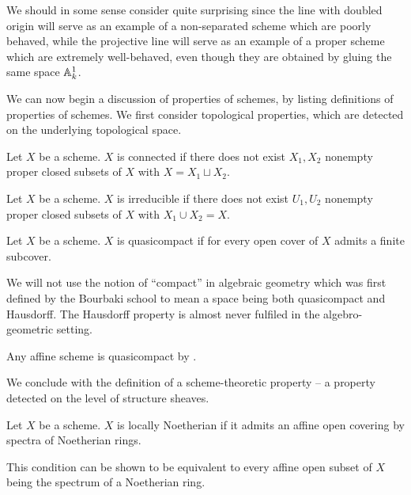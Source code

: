 \begin{remark}
    We should in some sense consider  quite surprising since the line with doubled origin will serve as an example of a non-separated scheme which are poorly behaved, while the projective line will serve as an example of a proper scheme which are extremely well-behaved, even though they are obtained by gluing the same space $\mathbb{A}^{1}_{k}$. 
\end{remark}
We can now begin a discussion of properties of schemes, by listing definitions of properties of schemes. We first consider topological properties, which are detected on the underlying topological space. 
\begin{definition}[Connected]\label{def: connected scheme}
    Let $X$ be a scheme. $X$ is connected if there does not exist $X_{1},X_{2}$ nonempty proper closed subsets of $X$ with $X=X_{1}\sqcup X_{2}$. 
\end{definition}
\begin{definition}[Irreducible]\label{def: irreducible}
    Let $X$ be a scheme. $X$ is irreducible if there does not exist $U_{1},U_{2}$ nonempty proper closed subsets of $X$ with $X_{1}\cup X_{2}=X$. 
\end{definition}
\begin{definition}[Quasicompact]\label{def: quasicompact}
    Let $X$ be a scheme. $X$ is quasicompact if for every open cover of $X$ admits a finite subcover. 
\end{definition}
\begin{remark}
    We will not use the notion of ``compact'' in algebraic geometry which was first defined by the Bourbaki school to mean a space being both quasicompact and Hausdorff. The Hausdorff property is almost never fulfiled in the algebro-geometric setting. 
\end{remark}
\begin{example}
    Any affine scheme is quasicompact by .
\end{example}
We conclude with the definition of a scheme-theoretic property -- a property detected on the level of structure sheaves. 
\begin{definition}\label{lem: locally Noetherian}
    Let $X$ be a scheme. $X$ is locally Noetherian if it admits an affine open covering by spectra of Noetherian rings. 
\end{definition}
\begin{remark}
    This condition can be shown to be equivalent to every affine open subset of $X$ being the spectrum of a Noetherian ring. 
\end{remark}